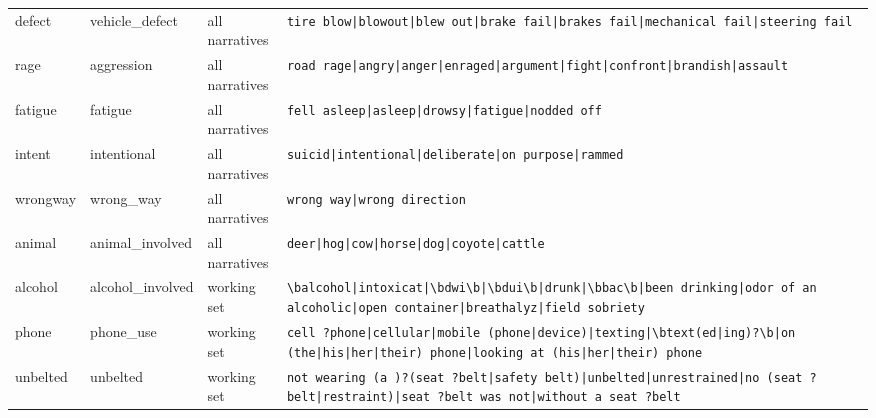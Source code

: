 \begin{small}
\begin{longtable}{l>{\raggedright\arraybackslash}p{71.2pt}>{\raggedright\arraybackslash}p{44.5pt}>{\raggedright\arraybackslash}p{289.2pt}}
defect & vehicle\_defect & all narratives & \texttt{tire blow|\allowbreak{}blowout|\allowbreak{}blew out|\allowbreak{}brake fail|\allowbreak{}brakes fail|\allowbreak{}mechanical fail|\allowbreak{}steering fail} \\
rage & aggression & all narratives & \texttt{road rage|\allowbreak{}angry|\allowbreak{}anger|\allowbreak{}enraged|\allowbreak{}argument|\allowbreak{}fight|\allowbreak{}confront|\allowbreak{}brandish|\allowbreak{}assault} \\
fatigue & fatigue & all narratives & \texttt{fell asleep|\allowbreak{}asleep|\allowbreak{}drowsy|\allowbreak{}fatigue|\allowbreak{}nodded off} \\
intent & intentional & all narratives & \texttt{suicid|\allowbreak{}intentional|\allowbreak{}deliberate|\allowbreak{}on purpose|\allowbreak{}rammed} \\
wrongway & wrong\_way & all narratives & \texttt{wrong way|\allowbreak{}wrong direction} \\
animal & animal\_involved & all narratives & \texttt{deer|\allowbreak{}hog|\allowbreak{}cow|\allowbreak{}horse|\allowbreak{}dog|\allowbreak{}coyote|\allowbreak{}cattle} \\
alcohol & alcohol\_involved & working set & \texttt{\textbackslash{}balcohol|\allowbreak{}intoxicat|\allowbreak{}\textbackslash{}bdwi\textbackslash{}b|\allowbreak{}\textbackslash{}bdui\textbackslash{}b|\allowbreak{}drunk|\allowbreak{}\textbackslash{}bbac\textbackslash{}b|\allowbreak{}been drinking|\allowbreak{}odor of an alcoholic|\allowbreak{}open container|\allowbreak{}breathalyz|\allowbreak{}field sobriety} \\
phone & phone\_use & working set & \texttt{cell ?phone|\allowbreak{}cellular|\allowbreak{}mobile (phone|\allowbreak{}device)|\allowbreak{}texting|\allowbreak{}\textbackslash{}btext(ed|\allowbreak{}ing)?\textbackslash{}b|\allowbreak{}on (the|\allowbreak{}his|\allowbreak{}her|\allowbreak{}their) phone|\allowbreak{}looking at (his|\allowbreak{}her|\allowbreak{}their) phone} \\
unbelted & unbelted & working set & \texttt{not wearing (a )?(seat ?belt|\allowbreak{}safety belt)|\allowbreak{}unbelted|\allowbreak{}unrestrained|\allowbreak{}no (seat ?belt|\allowbreak{}restraint)|\allowbreak{}seat ?belt was not|\allowbreak{}without a seat ?belt} \\
\end{longtable}
\end{small}
